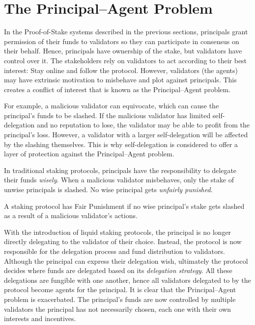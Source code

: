 \section{The Principal--Agent Problem}
In the Proof-of-Stake systems described in the previous sections,
principals grant permission of their funds to validators so they can
participate in consensus on their behalf.
Hence, principals have ownership of the stake, but
validators have control over it.
The stakeholders rely on validators to act according to their
best interest: Stay online and follow the protocol.
However, validators (the agents) may have extrinsic motivation to
misbehave and plot against principals. This creates
a conflict of interest that is known as the Principal--Agent problem.

For example, a malicious validator can equivocate, which can cause
the principal's funds to be slashed. If the malicious validator has
limited self-delegation and no reputation to lose, the validator
may be able to profit from the principal's loss. However, a validator
with a larger self-delegation will be affected by the slashing themselves.
This is why self-delegation is considered to offer a layer of protection
against the Principal--Agent problem.

In traditional staking protocols, principals have the responsibility to
delegate their funds \emph{wisely}.
When a malicious validator misbehaves, only the stake of unwise principals is
slashed. No wise principal gets \emph{unfairly punished}.

\begin{definition}
    A staking protocol has Fair Punishment if no wise principal's
    stake gets slashed as a result of a malicious validator's actions.
\end{definition}

With the introduction of liquid staking protocols, the principal
is no longer directly delegating to the validator of their choice.
Instead, the protocol is now responsible for the delegation process
and fund distribution to validators.
Although the principal can express their delegation wish, ultimately
the protocol decides where funds are delegated based on its
\emph{delegation strategy}. All these delegations are fungible
with one another, hence all validators delegated to by
the protocol become agents for the principal.
It is clear that the Principal--Agent problem is exacerbated.
The principal's funds are now controlled by multiple validators
the principal has not necessarily chosen, each one with their own
interests and incentives.